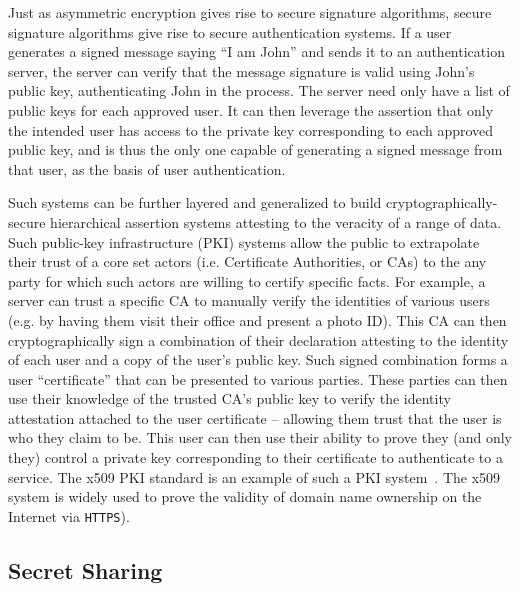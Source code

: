 Just as asymmetric encryption gives rise to secure signature
algorithms, secure signature algorithms give rise to secure
authentication systems. If a user generates a signed message saying
``I am John'' and sends it to an authentication server, the server can
verify that the message signature is valid using John's public key,
authenticating John in the process. The server need only have a list
of public keys for each approved user. It can then leverage the
assertion that only the intended user has access to the private key
corresponding to each approved public key, and is thus the only one
capable of generating a signed message from that user, as the basis of
user authentication.

Such systems can be further layered and generalized to build
cryptographically-secure hierarchical assertion systems attesting to
the veracity of a range of data. Such public-key infrastructure (PKI)
systems allow the public to extrapolate their trust of a core set
actors (i.e. Certificate Authorities, or CAs) to the any party for
which such actors are willing to certify specific facts. For example,
a server can trust a specific CA to manually verify the identities of
various users (e.g. by having them visit their office and present a
photo ID). This CA can then cryptographically sign a combination of
their declaration attesting to the identity of each user and a copy of
the user's public key. Such signed combination forms a user
``certificate'' that can be presented to various parties. These
parties can then use their knowledge of the trusted CA's public key to
verify the identity attestation attached to the user certificate --
allowing them trust that the user is who they claim to be. This user
can then use their ability to prove they (and only they) control a
private key corresponding to their certificate to authenticate to a
service. The x509 PKI standard is an example of such a PKI
system~\cite{rfc5280}. The x509 system is widely used to prove the
validity of domain name ownership on the Internet via \texttt{HTTPS}).

\subsection{Secret Sharing}

